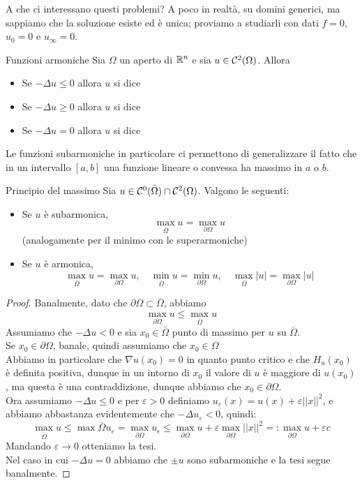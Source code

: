 \documentclass{article}
\begin{document}
A che ci interessano questi problemi? A poco in realtà, su domini generici, ma sappiamo che la soluzione esiste ed è unica; proviamo a studiarli con dati $f= 0$, $u_0 = 0$ e $u_\infty = 0$.

\begin{definition}{Funzioni armoniche}{}
    Sia $\Omega$ un aperto di $\mathbb{R}^n$ e sia $u\in\mathcal{C}^2(\Omega)$. Allora\begin{itemize}
        \item Se $-\Delta u \le 0$ allora $u$ si dice 
        \item Se $-\Delta u \ge 0$ allora $u$ si dice 
        \item Se $-\Delta u = 0$ allora $u$ si dice 
    \end{itemize}
\end{definition}

Le funzioni subarmoniche in particolare ci permettono di generalizzare il fatto che in un intervallo $[a,b]$ una funzione lineare o convessa ha massimo in $a$ o $b$.

\begin{theorem}{Principio del massimo}{}
    Sia $u\in\mathcal{C}^0(\bar{\Omega})\cap\mathcal{C}^2(\Omega)$. Valgono le seguenti:\begin{itemize}
        \item Se $u$ è subarmonica, \[\max_{\bar{\Omega}}u = \max_{\partial\Omega}u\] (analogamente per il minimo con le superarmoniche)
        \item Se $u$ è armonica, \[\max_{\bar{\Omega}} u = \max_{\partial\Omega}u, \quad \min_{\bar{\Omega}} u = \min_{\partial\Omega}u, \quad \max_{\bar{\Omega}}|u| = \max_{\partial\Omega}|u|\]
    \end{itemize}
\end{theorem}

\begin{proof}
    Banalmente, dato che $\partial\Omega\subset\bar{\Omega}$, abbiamo \[\max_{\partial\Omega} u \le \max_{\bar{\Omega}} u\]
    Assumiamo che $-\Delta u < 0$ e sia $x_0\in\bar{\Omega}$ punto di massimo per $u$ su $\bar{\Omega}$.\\
    Se $x_0\in\partial\Omega$, banale, quindi assumiamo che $x_0\in\Omega$\\
    Abbiamo in particolare che $\nabla u (x_0) = 0$ in quanto punto critico e che $H_u(x_0)$ è definita positiva, dunque in un intorno di $x_0$ il valore di $u$ è maggiore di $u(x_0)$, ma questa è una contraddizione, dunque abbiamo che $x_0\in\partial\Omega$.\\
    Ora assumiamo $-\Delta u \le 0$ e per $\varepsilon>0$ definiamo $u_\varepsilon(x) = u(x)+\varepsilon ||x||^2$, e abbiamo abbastanza evidentemente che $-\Delta u_\varepsilon < 0$, quindi:
    \[\max_{\bar{\Omega}}u \le \max{\bar{\Omega}} u_\varepsilon = \max_{\partial\Omega} u_\epsilon \le \max_{\partial\Omega} u + \varepsilon \max_{\partial\Omega}||x||^2 =: \max_{\partial\Omega} u + \varepsilon c \]
    Mandando $\varepsilon\to 0$ otteniamo la tesi.\\
    Nel caso in cui $-\Delta u = 0$ abbiamo che $\pm u$ sono subarmoniche e la tesi segue banalmente.
\end{proof}
\end{document}
